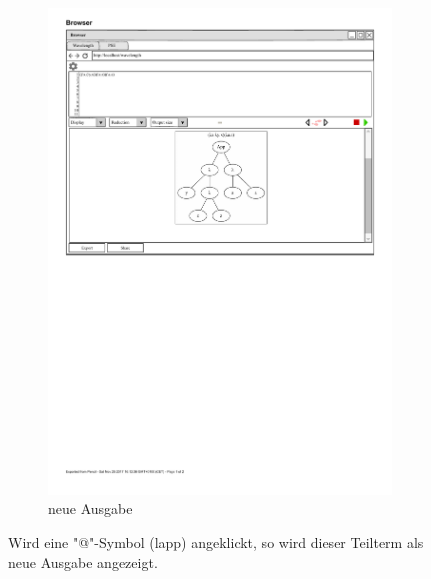 \documentclass[parskip=full,11pt,twoside]{scrartcl}
\begin{document}
\begin{figure}[H]
\begin{subfigure}{0.5\textwidth}
		\includegraphics{img/displayTree3}
		\caption{neue Ausgabe}
	\end{subfigure}
	\caption{Wird eine "@"-Symbol (\gls{lapp}) angeklickt, so wird dieser Teilterm als neue Ausgabe angezeigt.}
\end{figure}
\end{document}
